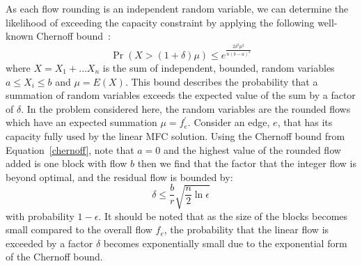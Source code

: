 As each flow rounding is an independent random variable, we can determine the likelihood of exceeding the capacity constraint by applying the following well-known Chernoff bound~\cite{chernoff1952}:
\begin{equation}
  \label{chernoff}
  \Pr(X > (1+\delta)\mu) \leq e^{\frac{2\delta^2\mu^2}{n(b-a)^2}}
\end{equation}
where $X=X_1 + \ldots X_n$ is the sum of independent, bounded, random variables $a \leq X_i \leq b$ and $\mu = E{(X)} $. This bound describes the probability that a summation of random variables exceeds the expected value of the sum by a factor of $\delta$. In the problem considered here, the random variables are the rounded flows which have an expected summation $\mu = f^\prime_e$. Consider an edge, $e$, that has its capacity fully used by the linear MFC solution. Using the Chernoff bound from Equation~\eqref{chernoff}, note that $a=0$ and the highest value of the rounded flow added is one block with flow $b$ then we find that the factor that the integer flow is beyond optimal, and the residual flow is bounded by:
\begin{equation}
  \label{block}
  \delta \leq \frac{b}{r} \sqrt{\frac{n}{2}\ln\epsilon}
\end{equation}
with probability $1-\epsilon$. It should be noted that as the size of the blocks becomes small compared to the overall flow $f_e$, the probability that the linear flow is exceeded by a factor $\delta$ becomes exponentially small due to the exponential form of the Chernoff bound.
